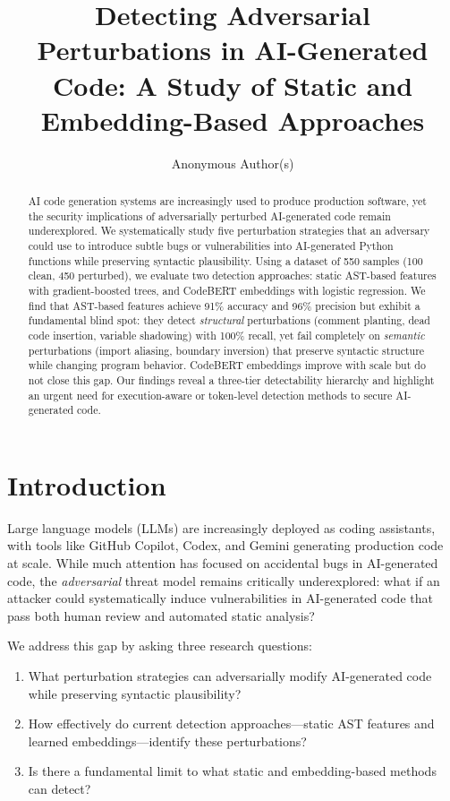 \documentclass[11pt]{article}
\title{Detecting Adversarial Perturbations in AI-Generated Code: A Study of Static and Embedding-Based Approaches}
\author{Anonymous Author(s)}
\date{}
\begin{document}
\maketitle

\begin{abstract}
AI code generation systems are increasingly used to produce production software, yet the security implications of adversarially perturbed AI-generated code remain underexplored. We systematically study five perturbation strategies that an adversary could use to introduce subtle bugs or vulnerabilities into AI-generated Python functions while preserving syntactic plausibility. Using a dataset of 550 samples (100 clean, 450 perturbed), we evaluate two detection approaches: static AST-based features with gradient-boosted trees, and CodeBERT embeddings with logistic regression. We find that AST-based features achieve 91\% accuracy and 96\% precision but exhibit a fundamental blind spot: they detect \textit{structural} perturbations (comment planting, dead code insertion, variable shadowing) with 100\% recall, yet fail completely on \textit{semantic} perturbations (import aliasing, boundary inversion) that preserve syntactic structure while changing program behavior. CodeBERT embeddings improve with scale but do not close this gap. Our findings reveal a three-tier detectability hierarchy and highlight an urgent need for execution-aware or token-level detection methods to secure AI-generated code.
\end{abstract}

\section{Introduction}
\label{sec:intro}

Large language models (LLMs) are increasingly deployed as coding assistants, with tools like GitHub Copilot, Codex, and Gemini generating production code at scale. While much attention has focused on accidental bugs in AI-generated code, the \textit{adversarial} threat model remains critically underexplored: what if an attacker could systematically induce vulnerabilities in AI-generated code that pass both human review and automated static analysis?

We address this gap by asking three research questions:

\begin{enumerate}
    \item What perturbation strategies can adversarially modify AI-generated code while preserving syntactic plausibility?
    \item How effectively do current detection approaches—static AST features and learned embeddings—identify these perturbations?
    \item Is there a fundamental limit to what static and embedding-based methods can detect?
\end{enumerate}
\end{document}
